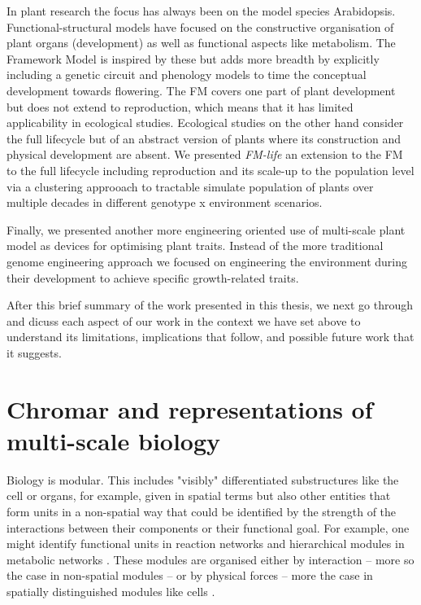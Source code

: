 \documentclass[phd]{infthesis}
\begin{document}
In plant research the focus has always been on the model species
Arabidopsis. Functional-structural models have focused on the constructive
organisation of plant organs (development) as well as functional aspects like
metabolism. The Framework Model is inspired by these but adds more breadth by
explicitly including a genetic circuit and phenology models to time the
conceptual development towards flowering. The FM covers one part of plant
development but does not extend to reproduction, which means that it has limited
applicability in ecological studies. Ecological studies on the other hand
consider the full lifecycle but of an abstract version of plants where its
construction and physical development are absent. We presented \emph{FM-life}
an extension to the FM to the full lifecycle including reproduction and its
scale-up to the population level via a clustering approoach to tractable
simulate population of plants over multiple decades in different genotype x
environment scenarios.

Finally, we presented another more engineering oriented use of multi-scale plant
model as devices for optimising plant traits. Instead of the more traditional
genome engineering approach we focused on engineering the environment during
their development to achieve specific growth-related traits.

After this brief summary of the work presented in this thesis, we next go
through and dicuss each aspect of our work in the context we have set above to
understand its limitations, implications that follow, and possible future work
that it suggests.

\section{Chromar and representations of multi-scale biology}
Biology is modular. This includes "visibly" differentiated substructures like
the cell or organs, for example, given in spatial terms but also other entities
that form units in a non-spatial way that could be identified by the strength of
the interactions between their components or their functional goal. For example,
one might identify functional units in reaction networks
\citep{ederer_approach_2003} and hierarchical modules in metabolic networks
\citep{ravasz_hierarchical_2002}. These modules are organised either by
interaction -- more so the case in non-spatial modules -- or by physical forces
-- more the case in spatially distinguished modules like cells
\citep['Biological and Physical systems' section]{simon1962architecture}.
\end{document}
